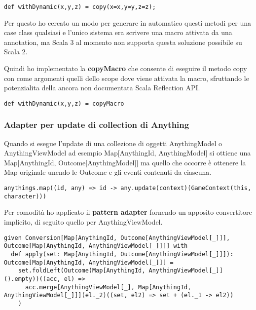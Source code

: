 \begin{lstlisting}[basicstyle=\tiny]
def withDynamic(x,y,z) = copy(x=x,y=y,z=z); 
\end{lstlisting}

Per questo ho cercato un modo per generare in automatico questi metodi per una case class qualsiasi e l'unico sistema era scrivere una macro attivata da una annotation, ma Scala 3 al momento non supporta questa soluzione possibile su Scala 2.

Quindi ho implementato la \textbf{copyMacro} che consente di eseguire il metodo copy con come argomenti quelli dello scope dove viene attivata la macro, sfruttando le potenzialita della ancora non documentata Scala Reflection API. 

\begin{lstlisting}[basicstyle=\tiny]
def withDynamic(x,y,z) = copyMacro
\end{lstlisting}

\subsubsection{Adapter per update di collection di Anything}

Quando si esegue l'update di una collezione di oggetti AnythingModel o AnythingViewModel ad esempio Map[AnythingId, AnythingModel] si ottiene una Map[AnythingId, Outcome[AnythingModel]] ma quello che occorre è ottenere la Map originale unendo le Outcome e gli eventi contenuti da ciascuna.

\begin{lstlisting}[basicstyle=\tiny]
anythings.map((id, any) => id -> any.update(context)(GameContext(this, character)))
\end{lstlisting}

Per comodità ho applicato il \textbf{pattern adapter} fornendo un apposito convertitore implicito, di seguito quello per AnythingViewModel.

\begin{lstlisting}[basicstyle=\tiny]
given Conversion[Map[AnythingId, Outcome[AnythingViewModel[_]]], Outcome[Map[AnythingId, AnythingViewModel[_]]]] with
  def apply(set: Map[AnythingId, Outcome[AnythingViewModel[_]]]): Outcome[Map[AnythingId, AnythingViewModel[_]]] =
    set.foldLeft(Outcome(Map[AnythingId, AnythingViewModel[_]]().empty))((acc, el) =>
      acc.merge[AnythingViewModel[_], Map[AnythingId, AnythingViewModel[_]]](el._2)((set, el2) => set + (el._1 -> el2))
    )
\end{lstlisting}

